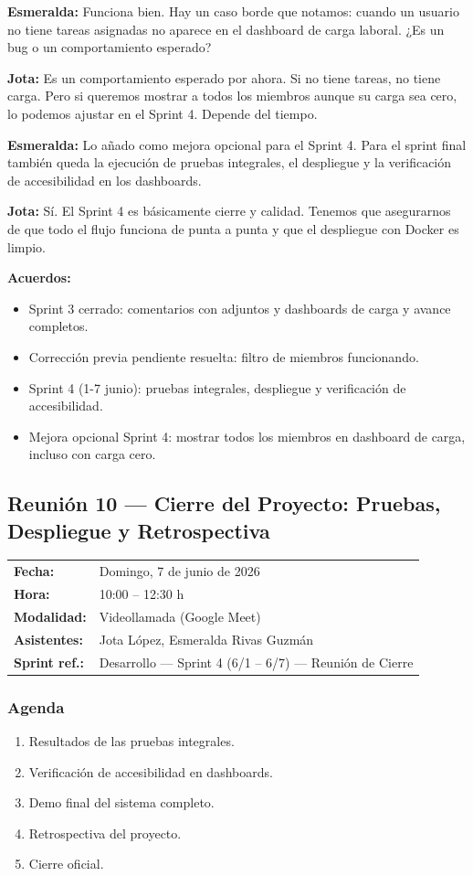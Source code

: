 \documentclass[12pt, a4paper]{article}
\makeatletter
\newcommand{\actaheader}[5]{%
  \begin{mdframed}[
    backgroundcolor=sectionbg,
    linecolor=bordercolor,
    linewidth=1pt,
    innerleftmargin=12pt, innerrightmargin=12pt,
    innertopmargin=10pt, innerbottommargin=10pt,
    skipabove=8pt, skipbelow=8pt
  ]
  \begin{tabularx}{\linewidth}{@{}lX@{}}
    \textbf{Fecha:}       & #1 \\[2pt]
    \textbf{Hora:}        & #2 \\[2pt]
    \textbf{Modalidad:}   & #3 \\[2pt]
    \textbf{Asistentes:}  & #4 \\[2pt]
    \textbf{Sprint ref.:} & #5 \\
  \end{tabularx}
  \end{mdframed}%
}
\newcommand{\jota}[1]{\noindent\textbf{\color{primary}Jota:} #1\par\smallskip}
\newcommand{\esme}[1]{\noindent\textbf{\color{accentgreen}Esmeralda:} #1\par\smallskip}
\makeatother
\begin{document}
\esme{Funciona bien. Hay un caso borde que notamos: cuando un usuario no tiene tareas asignadas no aparece en el dashboard de carga laboral. ¿Es un bug o un comportamiento esperado?}

\jota{Es un comportamiento esperado por ahora. Si no tiene tareas, no tiene carga. Pero si queremos mostrar a todos los miembros aunque su carga sea cero, lo podemos ajustar en el Sprint 4. Depende del tiempo.}

\esme{Lo añado como mejora opcional para el Sprint 4. Para el sprint final también queda la ejecución de pruebas integrales, el despliegue y la verificación de accesibilidad en los dashboards.}

\jota{Sí. El Sprint 4 es básicamente cierre y calidad. Tenemos que asegurarnos de que todo el flujo funciona de punta a punta y que el despliegue con Docker es limpio.}

\begin{acuerdobox}
\textbf{Acuerdos:}
\begin{itemize}[leftmargin=1.2em, topsep=2pt]
  \item Sprint 3 cerrado: comentarios con adjuntos y dashboards de carga y avance completos.
  \item Corrección previa pendiente resuelta: filtro de miembros funcionando.
  \item Sprint 4 (1-7 junio): pruebas integrales, despliegue y verificación de accesibilidad.
  \item Mejora opcional Sprint 4: mostrar todos los miembros en dashboard de carga, incluso con carga cero.
\end{itemize}
\end{acuerdobox}

\subsection{Reunión 10 — Cierre del Proyecto: Pruebas, Despliegue y Retrospectiva}
\actaheader
  {Domingo, 7 de junio de 2026}
  {10:00 -- 12:30 h}
  {Videollamada (Google Meet)}
  {Jota López, Esmeralda Rivas Guzmán}
  {Desarrollo — Sprint 4 (6/1 -- 6/7) — Reunión de Cierre}

\subsubsection*{Agenda}
\begin{enumerate}[leftmargin=1.5em]
  \item Resultados de las pruebas integrales.
  \item Verificación de accesibilidad en dashboards.
  \item Demo final del sistema completo.
  \item Retrospectiva del proyecto.
  \item Cierre oficial.
\end{enumerate}
\end{document}
